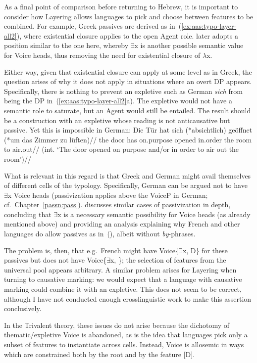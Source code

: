 As a final point of comparison before returning to Hebrew, it is important to consider how Layering allows languages to pick and choose between features to be combined. For example, Greek passives are derived as in~(\ref{ex:aas:typo-layer-all2}), where existential closure applies to the open Agent role. \cite{schaefer17oup} later adopts a position similar to the one here, whereby $\exists$x is another possible semantic value for Voice heads, thus removing the need for existential closure of $\lambda$x.

Either way, given that existential closure can apply at some level as in Greek, the question arises of why it does not apply in situations where an overt DP appears. Specifically, there is nothing to prevent an expletive such as German \emph{sich} from being the DP in~(\ref{ex:aas:typo-layer-all2}a). The expletive would not have a semantic role to saturate, but an Agent would still be entailed. The result should be a construction with an expletive whose reading is not anticausative but passive. Yet this is impossible in German:
\ex \begingl
	\gla Die T\"ur hat sich (*absichtlich) ge\"offnet (*um das Zimmer zu l\"uften)//
	\glb the door has  on.purpose opened in.order the room to air.out//
	\glft (int. `The door opened on purpose and/or in order to air out the room')//
	\endgl
\xe

What is relevant in this regard is that Greek and German might avail themselves of different cells of the typology. Specifically, German can be argued not to have $\exists$x Voice heads (passivization applies above the VoiceP in German; cf.~Chapter~\ref{passn:pass}). \cite{schaefer17oup} discusses similar cases of passivization in depth, concluding that $\exists$x is a necessary semantic possibility for Voice heads (as already mentioned above) and providing an analysis explaining why French and other languages do allow passives as in~(\lastx), albeit without \emph{by}-phrases.

The problem is, then, that e.g.~French might have Voice\{$\exists$x, D\} for these passives but does not have Voice\{$\exists$x, \zero\}; the selection of features from the universal pool appears arbitrary. A similar problem arises for Layering when turning to causative marking: we would expect that a language with causative marking could combine it with an expletive. This does not seem to be correct, although I have not conducted enough crosslinguistic work to make this assertion conclusively.

In the Trivalent theory, these issues do not arise because the dichotomy of thematic/expletive Voice is abandoned, as is the idea that languages pick only a subset of features to instantiate across cells. Instead, Voice is allosemic in ways which are constrained both by the root and by the feature [D].


